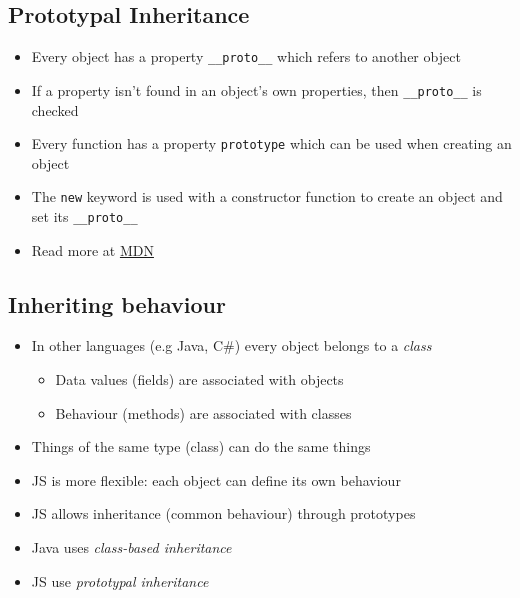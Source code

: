 \hypertarget{prototypal-inheritance}{%
\subsection{Prototypal Inheritance}\label{prototypal-inheritance}}

\begin{itemize}
\tightlist
\item
  Every object has a property \texttt{\_\_proto\_\_} which refers to
  another object
\item
  If a property isn't found in an object's own properties, then
  \texttt{\_\_proto\_\_} is checked
\item
  Every function has a property \texttt{prototype} which can be used
  when creating an object
\item
  The \texttt{new} keyword is used with a constructor function to create
  an object and set its \texttt{\_\_proto\_\_}
\item
  Read more at
  \href{https://developer.mozilla.org/en-US/docs/Web/JavaScript/Inheritance_and_the_prototype_chain}{MDN}
\end{itemize}

\hypertarget{inheriting-behaviour}{%
\subsection{Inheriting behaviour}\label{inheriting-behaviour}}

\begin{itemize}
\item
  In other languages (e.g Java, C\#) every object belongs to a
  \emph{class}

  \begin{itemize}
  \tightlist
  \item
    Data values (fields) are associated with objects
  \item
    Behaviour (methods) are associated with classes
  \end{itemize}
\item
  Things of the same type (class) can do the same things
\item
  JS is more flexible: each object can define its own behaviour
\item
  JS allows inheritance (common behaviour) through prototypes
\item
  Java uses \emph{class-based inheritance}
\item
  JS use \emph{prototypal inheritance}
\end{itemize}

